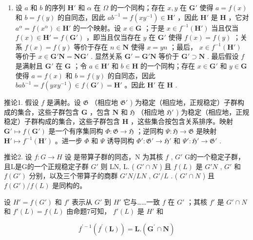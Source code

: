 \begin{enumerate}
\def\labelenumi{(\alph{enumi})}
\setcounter{enumi}{1}
\tightlist
\item
  设 \(a\) 和 \(b\) 的序列 \(\mathbf{H}'\) 和 \(\alpha\) 在 \(\Omega\) 的一个同构；存在 \(x, y\) 在 \(\mathbf{G}'\) 使得 \(a = f(x)\) 和 \(b = f(y)\) 的自同态，因此 \(ab^{-1} = f(xy^{-1}) \in \mathbf{H}'\) ，因此 \(\mathbf{H}'\) 是 \(\mathbf{H}\) ，它对 \(a^{\alpha} = f(x^{\alpha}) \in \mathbf{H}'\) 的一个映射。设 \(x \in \mathbf{G}\) ；于是 \(x \in f^{-1}(\mathbf{H}')\) 当且仅当 \(f(x) \in \mathbf{H}' = f(\mathbf{G}')\) ，即当且仅当存在 \(y\) 在 \(\mathbf{G}'\) 使得 \(f(x) = f(y)\) ；关系 \(f(x) = f(y)\) 等价于存在 \(n \in \mathbf{N}\) 使得 \(x = yn\) ；最后， \(x \in f^{-1}(\mathbf{H}')\) 等价于 \(x \in \mathbf{G}'\mathbf{N} = \mathbf{NG}'\) . 显然关系 \(\mathbf{G}' = \mathbf{G}'\mathbf{N}\) 等价于 \(\mathbf{G}' \supset \mathbf{N}\) . 最后假设 \(f\) 是满射且 \(\mathbf{G}'\) 在 \(\mathbf{G}\) ；令 \(a \in \mathbf{H}'\) 和 \(b \in \mathbf{H}\) 的一个同构；存在 \(x \in \mathbf{G}'\) 和 \(y \in \mathbf{G}\) 使得 \(a = f(x)\) 和 \(b = f(y)\) 的自同态，因此 \(bab^{-1} = f(yxy^{-1}) \in f(\mathbf{G}') = \mathbf{H}'\) 。因此 \(\mathbf{H}'\) 在 \(\mathbf{H}\) .
\end{enumerate}

推论1. 假设 \(f\) 是满射。设 \(\mathfrak{G}\) （相应地 \(\mathfrak{G}'\) ) 为稳定（相应地，正规稳定）子群构成的集合，这些子群包含 \(\mathbf{G}\) ，包含 \(\mathbf{N}\) 和 \(\mathfrak{H}\) （相应地 \(\mathfrak{H}'\) ) 为稳定（相应地，正规稳定）子群构成的集合，这些子群包含 \(\mathbf{H}\) ，这些集合按包含关系排序。映射 \(\mathbf{G}' \mapsto f(\mathbf{G}')\) 是一个有序集同构 \(\Phi: \mathfrak{G} \to \mathfrak{H}\) ；逆同构 \(\Psi: \mathfrak{H} \to \mathfrak{G}\) 是映射 \(\mathbf{H}' \mapsto f^{-1}(\mathbf{H}')\) 。进一步 \(\Phi\) 和 \(\Psi\) 诱导同构 \(\Phi': \mathfrak{G}' \to \mathfrak{H}'\) 和 \(\Psi': \mathfrak{H}' \to \mathfrak{G}'\) .

推论2. 设 \(f: G \to H\) 设 是带算子群的同态，N 为其核 \(f\) , \(G'\) G的一个稳定子群，且L是G的一个正规稳定子群 \(G'\) 则 LN, L. ( \(G' \cap N\) ) 且 \(f(L)\) 是 \(G'N\) , \(G'\) 和 \(f(G')\) 分别，以及三个带算子的商群 \(G'N/LN\) , \(G'/L\) . ( \(G' \cap N\) ) 且 \(f(G')/f(L)\) 是同构的。

设 \(H' = f(G')\) 和 \(f'\) 表示从 \(G'\) 到 \(H'\) 它与……一致 \(f\) 在 \(G'\) ；其核 \(f'\) 是 \(G' \cap N\) 和 \(f'(L) = f(L)\) 由命题7可知， \(f'(L)\) 是 \(H'\) 和

\[
f ^ {\prime - 1} (f ^ {\prime} (\mathbf {L})) = \mathbf {L}. (\mathbf {G} ^ {\prime} \cap \mathbf {N})
\]

